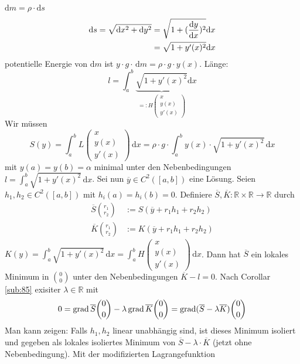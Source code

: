 $\mathrm{d}m = \rho \cdot \mathrm{d}s$
\begin{align*}
	  \mathrm{d}s = \sqrt{ \mathrm{d}x ^2 + \mathrm{d}y^2}   &= \sqrt{1+ (\frac{\mathrm{d} y}{\mathrm{d} x}  )^2 }  \mathrm{d}x   \\
	  &= \sqrt{1+ y'(x)^2} \mathrm{d}x   
\end{align*}
potentielle Energie von $ \mathrm{d}m$ ist $y \cdot  g \cdot  \, \mathrm{d}m = \rho \cdot g \cdot  y(x)$. Länge:
\[
	l = \int_{a} ^{b} \! \underbrace{\sqrt{1+ y'(x)^2}}_{=: H \begin{pmatrix}
		x \\ y(x) \\ y'(x)
	\end{pmatrix}}  \mathrm{d}x   
\]
Wir müssen 
\[
	S(y) = \int_{a} ^{b} \! L \begin{pmatrix}
		x \\ y(x) \\y'(x)
	\end{pmatrix}  \, \mathrm{d}x  = \rho \cdot g \cdot  \int_{a} ^{b} \! y(x) \cdot \sqrt{1+ y'(x)^2}  \, \mathrm{d}x   
\]
mit $y(a) = y(b) = \alpha$ minimal unter den Nebenbedingungen $l = \int_{a} ^{b} \! \sqrt{1+ y'(x)^2}  \, \mathrm{d}x   $. Sei nun $\overline{y} \in C^2([a,b])$ eine 
Lösung. Seien $h_1, h_2 \in C^2([a,b])$ mit $h_i (a) = h_i (b) = 0$. Definiere $\overline{S}, \overline{K} : \mathds{R}\times \mathds{R} \to \mathds{R}  $ durch 
\begin{align*}
	\overline{S} \binom{r_1}{r_2} &:= S(\overline{y} + r_1 h_1 + r_2 h_2 )  \\
	\overline{K} \binom{r_1}{r_2} &:= K(\overline{y} + r_1 h_1 + r_2 h_2)  
\end{align*} 
$K(y) = \int_{a} ^{b} \! \sqrt{1+ y'(x)^2}  \, \mathrm{d}x = \int_{a} ^{b} \! H \begin{pmatrix}
	x \\y(x) \\ y'(x) 
\end{pmatrix}   \, \mathrm{d}x $. Dann hat $\overline{S}$ ein lokales Minimum in $\binom{0}{0} $ unter den Nebenbedingungen $\overline{K} - l = 0 $. Nach Corollar \ref{sub:85} exisiter $\lambda \in \mathds{R}$ mit 
\[
	0 =\operatorname{grad} \overline{S} \binom{0}{0} - \lambda \operatorname{grad} \overline{K} \binom{0}{0} = \operatorname{grad} (\overline{S} - \lambda \overline{K}  ) \binom{0}{0}  
\]
Man kann zeigen: Falls $h_1, h_2$ linear unabhängig sind, ist dieses Minimum isoliert und gegeben als lokales isoliertes Minimum von 
$\overline{S} - \lambda \cdot \overline{K}$ (jetzt ohne Nebenbedingung). Mit der modifizierten Lagrangefunktion 
